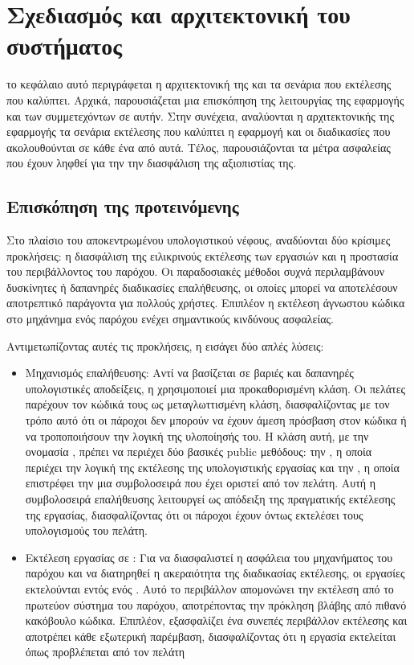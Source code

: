 \chapter{Σχεδιασμός και αρχιτεκτονική του συστήματος}
το κεφάλαιο αυτό περιγράφεται η αρχιτεκτονική της  και τα σενάρια που εκτέλεσης που καλύπτει. Αρχικά, παρουσιάζεται μια επισκόπηση της λειτουργίας της εφαρμογής και των συμμετεχόντων σε αυτήν. Στην συνέχεια, αναλύονται η αρχιτεκτονικής της εφαρμογής τα σενάρια εκτέλεσης που καλύπτει η εφαρμογή και οι διαδικασίες που ακολουθούνται σε κάθε ένα από αυτά. Τέλος, παρουσιάζονται τα μέτρα ασφαλείας που έχουν ληφθεί για την την διασφάλιση της αξιοπιστίας της.

\section{Επισκόπηση της προτεινόμενης }

Στο πλαίσιο του αποκεντρωμένου υπολογιστικού νέφους, αναδύονται 
δύο κρίσιμες προκλήσεις: η διασφάλιση της ειλικρινούς εκτέλεσης των εργασιών 
και η προστασία του περιβάλλοντος του παρόχου. Οι παραδοσιακές μέθοδοι συχνά 
περιλαμβάνουν δυσκίνητες ή δαπανηρές διαδικασίες επαλήθευσης, οι οποίες μπορεί 
να αποτελέσουν αποτρεπτικό παράγοντα για πολλούς χρήστες. Επιπλέον η εκτέλεση 
άγνωστου κώδικα στο μηχάνημα ενός παρόχου ενέχει σημαντικούς κινδύνους ασφαλείας.

Αντιμετωπίζοντας αυτές τις προκλήσεις, η  εισάγει δύο απλές λύσεις:
\begin{itemize}
\item Μηχανισμός επαλήθευσης: Αντί να βασίζεται σε βαριές και δαπανηρές 
υπολογιστικές αποδείξεις, η  χρησιμοποιεί μια προκαθορισμένη  κλάση. 
Οι πελάτες παρέχουν τον κώδικά τους ως μεταγλωττισμένη  κλάση, διασφαλίζοντας 
με τον τρόπο αυτό ότι οι πάροχοι δεν μπορούν να έχουν άμεση πρόσβαση στον κώδικα 
ή να τροποποιήσουν την λογική της υλοποίησής του. Η κλάση αυτή, με την ονομασία 
\textit{}, πρέπει να περιέχει δύο βασικές public μεθόδους: την \textit{}, η οποία περιέχει την λογική της εκτέλεσης της υπολογιστικής εργασίας και την \textit{}, η οποία επιστρέφει την μια συμβολοσειρά που έχει οριστεί από τον πελάτη. Αυτή η συμβολοσειρά επαλήθευσης λειτουργεί ως 
απόδειξη της πραγματικής εκτέλεσης της εργασίας, διασφαλίζοντας ότι οι πάροχοι 
έχουν όντως εκτελέσει τους υπολογισμούς του πελάτη.
\item Εκτέλεση εργασίας σε : Για να διασφαλιστεί η ασφάλεια του μηχανήματος του παρόχου και να διατηρηθεί η ακεραιότητα της διαδικασίας εκτέλεσης, οι εργασίες εκτελούνται εντός ενός . Αυτό το  περιβάλλον απομονώνει την εκτέλεση από το πρωτεύον σύστημα του παρόχου, αποτρέποντας την πρόκληση βλάβης από πιθανό κακόβουλο κώδικα. Επιπλέον, εξασφαλίζει ένα συνεπές περιβάλλον εκτέλεσης και αποτρέπει κάθε εξωτερική παρέμβαση, διασφαλίζοντας ότι η εργασία εκτελείται όπως προβλέπεται από τον πελάτη 
\end{itemize}

